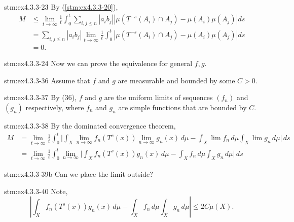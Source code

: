 \begin{statement}{stm:ex4.3.3-23}
By (\ref{stm:ex4.3.3-20}),
\begin{align*}
M&\leq \lim_{t \to \infty} \frac{1}{t} \int_0^t \sum_{i,j \leq n} |a_i b_j| \left| \mu(T^{-s}(A_i) \cap A_j) - \mu(A_i)\mu(A_j) \right| ds \\
&= \sum_{i,j \leq n} |a_i b_j| \lim_{t \to \infty} \frac{1}{t} \int_0^t \left| \mu(T^{-s}(A_i) \cap A_j) - \mu(A_i)\mu(A_j) \right| ds \\
&= 0.
\end{align*}
\end{statement}

\begin{explanation}{stm:ex4.3.3-24}
Now we can prove the equivalence for general $f, g$.
\end{explanation}

\begin{statement}{stm:ex4.3.3-36}
Assume that $f$ and $g$ are measurable and bounded by some $C > 0$. 
\end{statement}

\begin{statement}{stm:ex4.3.3-37}
By (36), $f$ and $g$ are the uniform limits of sequences $(f_n)$ and $(g_n)$ respectively, where $f_n$ and $g_n$ are simple functions that are bounded by $C$.
\end{statement}

\begin{statement}{stm:ex4.3.3-38}
By the dominated convergence theorem,
\begin{align*}
M &= \lim_{t \to \infty} \frac{1}{t} \int_0^t 
\Big| \int_X \lim_{n \to \infty} f_n(T^s(x)) \lim_{n \to \infty} g_n(x) \, d\mu 
- \int_X \lim f_n \, d\mu \int_X \lim g_n \, d\mu \Big| \, ds \\
&= \lim_{t \to \infty} \frac{1}{t} \int_0^t 
\lim_{n \to \infty} 
\Big| \int_X f_n(T^s(x)) g_n(x) \, d\mu 
- \int_X f_n \, d\mu \int_X g_n \, d\mu \Big| \, ds
\end{align*}
\end{statement}

\begin{explanation}{stm:ex4.3.3-39b}
Can we place the limit outside?
\end{explanation}

\begin{statement}{stm:ex4.3.3-40}
Note,
\[
\left| \int_X f_n(T^s(x)) g_n(x) \, d\mu 
- \int_X f_n \, d\mu \int_X g_n \, d\mu \right| \leq 2C \mu(X).
\]

\end{statement}

